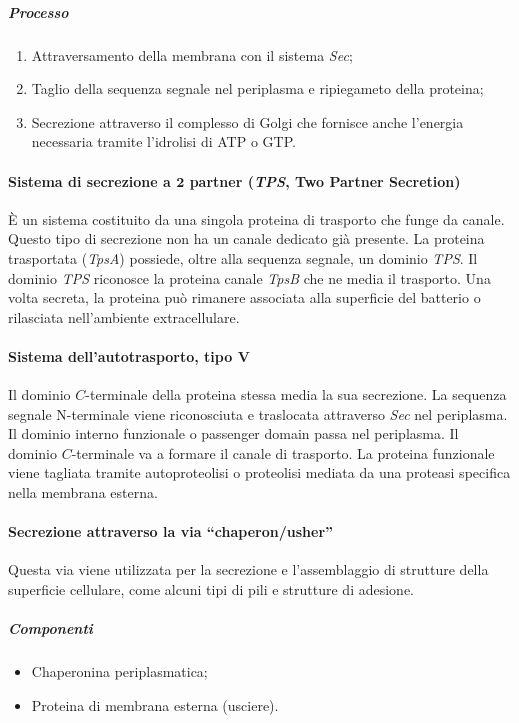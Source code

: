 				\subparagraph{Processo}
				\begin{enumerate}
					\item Attraversamento della membrana con il sistema \emph{Sec}; 
	    				\item Taglio della sequenza segnale nel periplasma e ripiegameto della proteina;
	    				\item Secrezione attraverso il complesso di Golgi che fornisce anche l'energia necessaria tramite l'idrolisi di ATP o GTP.
				\end{enumerate}

			\paragraph{Sistema di secrezione a $\mathbf{2}$ partner (\emph{TPS}, Two Partner Secretion)}
			\`E un sistema costituito da una singola proteina di trasporto che funge da canale. 
			Questo tipo di secrezione non ha un canale dedicato gi\`a presente.
			La proteina trasportata (\emph{TpsA}) possiede, oltre alla sequenza segnale, un dominio \emph{TPS}.
			Il dominio \emph{TPS} riconosce la proteina canale \emph{TpsB} che ne media il trasporto.
			Una volta secreta, la proteina pu\`o rimanere associata alla superficie del batterio o rilasciata nell'ambiente extracellulare. 

			\paragraph{Sistema dell'autotrasporto, tipo $\mathbf{V}$}
			Il dominio $C$-terminale della proteina stessa media la sua secrezione.
			La sequenza segnale N-terminale viene riconosciuta e traslocata attraverso \emph{Sec} nel periplasma.
			Il dominio interno funzionale o passenger domain passa nel periplasma.
			Il dominio $C$-terminale va a formare il canale di trasporto. 
			La proteina funzionale viene tagliata tramite autoproteolisi o proteolisi mediata da una proteasi specifica nella membrana esterna.

			\paragraph{Secrezione attraverso la via ``chaperon/usher''}
			Questa via viene utilizzata per la secrezione e l'assemblaggio di strutture della superficie cellulare, come alcuni tipi di pili e strutture di adesione. 
			
				\subparagraph{Componenti}
				\begin{itemize}
					\item Chaperonina periplasmatica; 
	    				\item Proteina di membrana esterna (usciere).
				\end{itemize}

